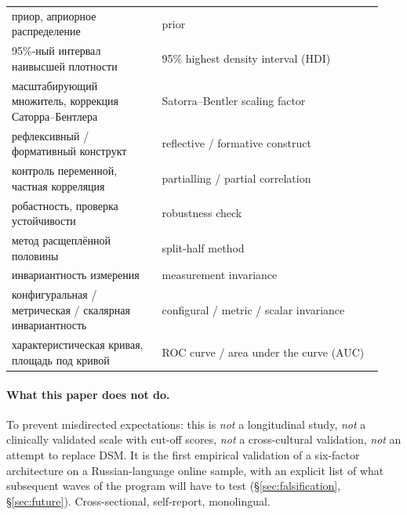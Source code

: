 \begin{center}
\begin{tabular}{p{0.38\linewidth}p{0.56\linewidth}}
приор, априорное распределение & prior \\
95\%-ный интервал наивысшей плотности & 95\% highest density interval (HDI) \\
масштабирующий множитель, коррекция Саторра--Бентлера & Satorra--Bentler scaling factor \\
рефлексивный / формативный конструкт & reflective / formative construct \\
контроль переменной, частная корреляция & partialling / partial correlation \\
робастность, проверка устойчивости & robustness check \\
метод расщеплённой половины & split-half method \\
инвариантность измерения & measurement invariance \\
конфигуральная / метрическая / скалярная инвариантность & configural / metric / scalar invariance \\
характеристическая кривая, площадь под кривой & ROC curve / area under the curve (AUC) \\
\bottomrule
\end{tabular}
\end{center}

\paragraph{What this paper does not do.} To prevent misdirected expectations: this is \emph{not} a longitudinal study, \emph{not} a clinically validated scale with cut-off scores, \emph{not} a cross-cultural validation, \emph{not} an attempt to replace DSM. It is the first empirical validation of a six-factor architecture on a Russian-language online sample, with an explicit list of what subsequent waves of the program will have to test (§\ref{sec:falsification}, §\ref{sec:future}). Cross-sectional, self-report, monolingual.

\clearpage
